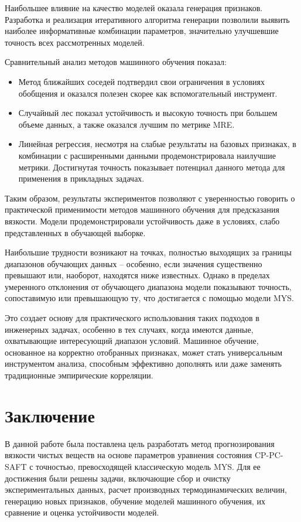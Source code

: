 \documentclass[a4paper,12pt]{article}
\begin{document}
    Наибольшее влияние на качество моделей оказала генерация признаков. Разработка и реализация итеративного алгоритма генерации позволили выявить наиболее информативные комбинации параметров, значительно улучшевшие точность всех рассмотренных моделей.
    
    Сравнительный анализ методов машинного обучения показал:
    \begin{itemize}
      \item Метод ближайших соседей подтвердил свои ограничения в условиях обобщения и оказался полезен скорее как вспомогательный инструмент.
      \item Случайный лес показал устойчивость и высокую точность при большем объеме данных, а также оказался лучшим по метрике MRE.
      \item Линейная регрессия, несмотря на слабые результаты на базовых признаках, в комбинации с расширенными данными продемонстрировала наилучшие метрики. Достигнутая точность показывает потенциал данного метода для применения в прикладных задачах.
    \end{itemize}

    Таким образом, результаты экспериментов позволяют с уверенностью говорить о практической применимости методов машинного обучения для предсказания вязкости. Модели продемонстрировали устойчивость даже в условиях, слабо представленных в обучающей выборке.

  Наибольшие трудности возникают на точках, полностью выходящих за границы диапазонов обучающих данных -- особенно, если значения существенно превышают или, наоборот, находятся ниже известных. Однако в пределах умеренного отклонения от обучающего диапазона модели показывают точность, сопоставимую или превышающую ту, что достигается с помощью модели MYS.

  Это создает основу для практического использования таких подходов в инженерных задачах, особенно в тех случаях, когда имеются данные, охватывающие интересующий диапазон условий. Машинное обучение, основанное на корректно отобранных признаках, может стать универсальным инструментом анализа, способным эффективно дополнять или даже заменять традиционные эмпирические корреляции.

\section*{Заключение}

  В данной работе была поставлена цель разработать метод прогнозирования вязкости чистых веществ на основе параметров уравнения состояния CP-PC-SAFT с точностью, превосходящей классическую модель MYS. Для ее достижения были решены задачи, включающие сбор и очистку экспериментальных данных, расчет производных термодинамических величин, генерацию новых признаков, обучение моделей машинного обучения, их сравнение и оценка устойчивости моделей.
\end{document}
